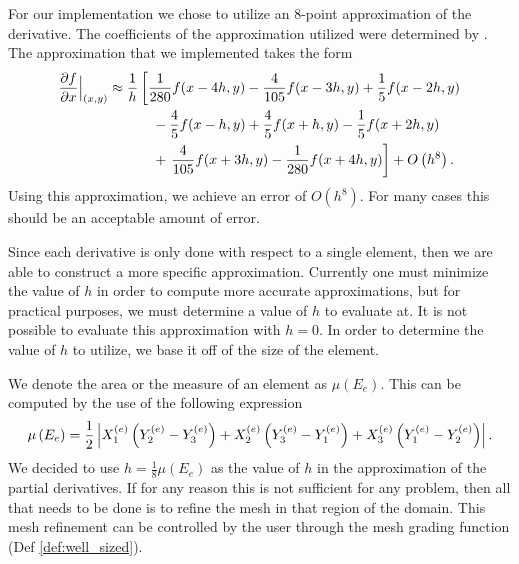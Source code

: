 \documentclass[../fem.tex]{subfile}
\begin{document}
For our implementation we chose to utilize an 8-point approximation of the
derivative. The coefficients of the approximation utilized were determined by
\cite{FD}. The approximation that we implemented takes the form
\begin{align*}
  \frac{\partial f}{\partial x}\Bigr|_{(x,y)}\approx\frac{1}{h}&\left[\frac{1}{280}f(x-4h,y)-\frac{4}{105}f(x-3h,y)+\frac{1}{5}f(x-2h,y)\right.\\
                                             &\quad-\frac{4}{5}f(x-h,y)+\frac{4}{5}f(x+h,y)-\frac{1}{5}f(x+2h,y)\\
                                             &\quad+\left.\frac{4}{105}f(x+3h,y)-\frac{1}{280}f(x+4h,y)\right]+O\left(h^8\right).
\end{align*}
Using this approximation, we achieve an error of $O\left(h^8\right)$. For many
cases this should be an acceptable amount of error.

Since each derivative is only done with respect to a single element, then we
are able to construct a more specific approximation. Currently one must
minimize the value of $h$ in order to compute more accurate approximations, but
for practical purposes, we must determine a value of $h$ to evaluate at. It is
not possible to evaluate this approximation with $h=0$. In order to determine
the value of $h$ to utilize, we base it off of the size of the element.

We denote the area or the measure of an element as $\mu\left(E_e\right)$. This
can be computed by the use of the following expression
\begin{align*}
  \mu\left(E_e\right)=\frac{1}{2}\left\vert
  X^{(e)}_1\left(Y^{(e)}_2-Y^{(e)}_3\right)+X^{(e)}_2\left(Y^{(e)}_3-Y^{(e)}_1\right)+X^{(e)}_3\left(Y^{(e)}_1-Y^{(e)}_2\right)\right\vert.
\end{align*}
We decided to use $h=\frac{1}{8}\mu\left(E_e\right)$ as the value of $h$ in the
approximation of the partial derivatives. If for any reason this is not
sufficient for any problem, then all that needs to be done is to refine the
mesh in that region of the domain. This mesh refinement can be controlled by
the user through the mesh grading function (Def \ref{def:well_sized}).
\end{document}
